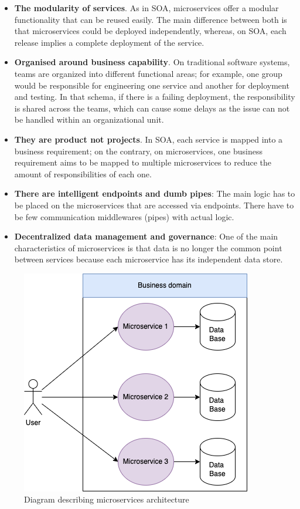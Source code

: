 \documentclass[english, 12pt, a4paper, sci, utf8, a-1b, online]{aaltothesis}
\begin{document}
\begin{itemize}
    \item \textbf{The modularity of services}. As in SOA, microservices offer a modular functionality that can be reused easily. The main difference between both is that microservices could be deployed independently, whereas, on SOA, each release implies a complete deployment of the service.
    \item \textbf{Organised around business capability}. On traditional software systems, teams are organized into different functional areas; for example, one group would be responsible for engineering one service and another for deployment and testing. In that schema, if there is a failing deployment, the responsibility is shared across the teams, which can cause some delays as the issue can not be handled within an organizational unit.
    \item \textbf{They are product not projects}. In SOA, each service is mapped into a business requirement; on the contrary, on microservices, one business requirement aims to be mapped to multiple microservices to reduce the amount of responsibilities of each one.
    \item \textbf{There are intelligent endpoints and dumb pipes}: The main logic has to be placed on the microservices that are accessed via endpoints. There have to be few communication middlewares (pipes) with actual logic.
    \item \textbf{Decentralized data management and governance}: One of the main characteristics of microservices is that data is no longer the common point between services because each microservice has its independent data store.
\end{itemize}

\begin{figure}[h]
    \centering
    \includegraphics[scale=0.4]{src/thesis/img/literature-review/microservices.png}
    \caption{Diagram describing microservices architecture}
    \label{fig:microservices-architecture}
\end{figure}
\end{document}
